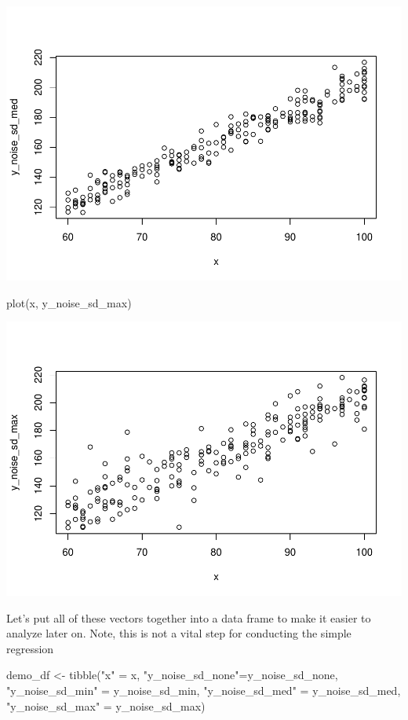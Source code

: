 \documentclass[
]{book}
\newenvironment{Shaded}{\begin{snugshade}}{\end{snugshade}}
\newcommand{\FunctionTok}[1]{\textcolor[rgb]{0.00,0.00,0.00}{#1}}
\newcommand{\NormalTok}[1]{#1}
\newcommand{\OtherTok}[1]{\textcolor[rgb]{0.56,0.35,0.01}{#1}}
\newcommand{\StringTok}[1]{\textcolor[rgb]{0.31,0.60,0.02}{#1}}
\begin{document}
\includegraphics{test_course_notes_files/figure-latex/remedy030-3.pdf}

\begin{Shaded}
\begin{Highlighting}[]
\FunctionTok{plot}\NormalTok{(x, y\_noise\_sd\_max)}
\end{Highlighting}
\end{Shaded}

\includegraphics{test_course_notes_files/figure-latex/remedy030-4.pdf}

Let's put all of these vectors together into a data frame to make it easier to analyze later on.
Note, this is not a vital step for conducting the simple regression

\begin{Shaded}
\begin{Highlighting}[]
\NormalTok{demo\_df }\OtherTok{\textless{}{-}} \FunctionTok{tibble}\NormalTok{(}\StringTok{"x"} \OtherTok{=}\NormalTok{ x, }
                  \StringTok{"y\_noise\_sd\_none"}\OtherTok{=}\NormalTok{y\_noise\_sd\_none, }
                  \StringTok{"y\_noise\_sd\_min"} \OtherTok{=}\NormalTok{ y\_noise\_sd\_min,}
                  \StringTok{"y\_noise\_sd\_med"} \OtherTok{=}\NormalTok{ y\_noise\_sd\_med,}
                  \StringTok{"y\_noise\_sd\_max"} \OtherTok{=}\NormalTok{ y\_noise\_sd\_max)}
\end{Highlighting}
\end{Shaded}
\end{document}
